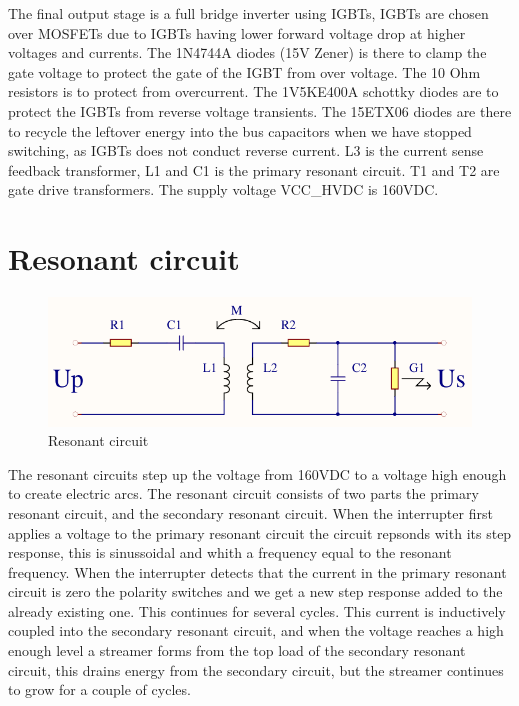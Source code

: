 The final output stage is a full bridge inverter using IGBTs, IGBTs are chosen over MOSFETs due to IGBTs having lower forward voltage drop at higher voltages and currents. The 1N4744A diodes (15V Zener) is there to clamp the gate voltage to protect the gate of the IGBT from over voltage. The 10 Ohm resistors is to protect from overcurrent. The 1V5KE400A schottky diodes are to protect the IGBTs from reverse voltage transients. The 15ETX06 diodes are there to recycle the leftover energy into the bus capacitors when we have stopped switching, as IGBTs does not conduct reverse current. L3 is the current sense feedback transformer, L1 and C1 is the primary resonant circuit. T1 and T2 are gate drive transformers. The supply voltage VCC\_HVDC is 160VDC.


\newpage
\section{Resonant circuit}

\begin{figure}[h!]
    \centering
    \includegraphics[width=\textwidth]{Skjema/Spolerigg1.pdf}
    \caption{Resonant circuit}
    \label{fig:spolerigg1}
\end{figure}

The resonant circuits step up the voltage from 160VDC to a voltage high enough to create electric arcs. The resonant circuit consists of two parts the primary resonant circuit, and the secondary resonant circuit. When the interrupter first applies a voltage to the primary resonant circuit the circuit repsonds with its step response, this is sinussoidal and whith a frequency equal to the resonant frequency. When the interrupter detects that the current in the primary resonant circuit is zero the polarity switches and we get a new step response added to the already existing one. This continues for several cycles. This current is inductively coupled into the secondary resonant circuit, and when the voltage reaches a high enough level a streamer forms from the top load of the secondary resonant circuit, this drains energy from the secondary circuit, but the streamer continues to grow for a couple of cycles.


\newpage